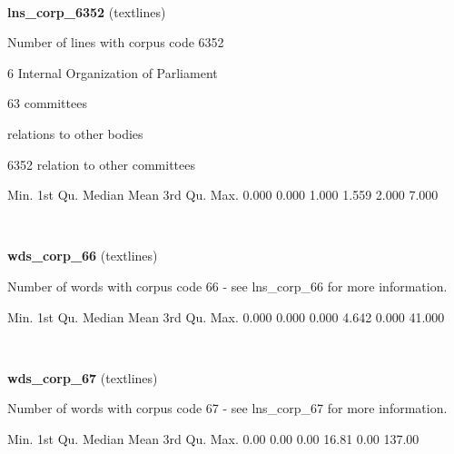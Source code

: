 \documentclass[]{article}
\newenvironment{Shaded}{\begin{snugshade}}{\end{snugshade}}
\newcommand{\FloatTok}[1]{\textcolor[rgb]{0.00,0.00,0.81}{{#1}}}
\newcommand{\NormalTok}[1]{{#1}}
\begin{document}
~

\vspace{1em}

\textbf{lns\_corp\_6352} (textlines)

Number of lines with corpus code 6352

6 Internal Organization of Parliament

63 committees

relations to other bodies

6352 relation to other committees

\begin{Shaded}
\begin{Highlighting}[]
   \NormalTok{Min. 1st Qu.  Median    Mean 3rd Qu.    Max. }
  \FloatTok{0.000}   \FloatTok{0.000}   \FloatTok{1.000}   \FloatTok{1.559}   \FloatTok{2.000}   \FloatTok{7.000} 
\end{Highlighting}
\end{Shaded}

~

\vspace{1em}

\textbf{wds\_corp\_66} (textlines)

Number of words with corpus code 66 - see lns\_corp\_66 for more
information.

\begin{Shaded}
\begin{Highlighting}[]
   \NormalTok{Min. 1st Qu.  Median    Mean 3rd Qu.    Max. }
  \FloatTok{0.000}   \FloatTok{0.000}   \FloatTok{0.000}   \FloatTok{4.642}   \FloatTok{0.000}  \FloatTok{41.000} 
\end{Highlighting}
\end{Shaded}

~

\vspace{1em}

\textbf{wds\_corp\_67} (textlines)

Number of words with corpus code 67 - see lns\_corp\_67 for more
information.

\begin{Shaded}
\begin{Highlighting}[]
   \NormalTok{Min. 1st Qu.  Median    Mean 3rd Qu.    Max. }
   \FloatTok{0.00}    \FloatTok{0.00}    \FloatTok{0.00}   \FloatTok{16.81}    \FloatTok{0.00}  \FloatTok{137.00} 
\end{Highlighting}
\end{Shaded}

~
\end{document}
